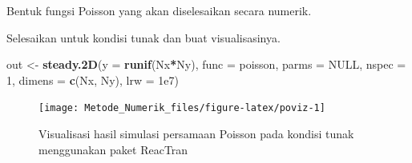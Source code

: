 \documentclass[]{book}
\newenvironment{Shaded}{\begin{snugshade}}{\end{snugshade}}
\newcommand{\ControlFlowTok}[1]{\textcolor[rgb]{0.13,0.29,0.53}{\textbf{#1}}}
\newcommand{\DataTypeTok}[1]{\textcolor[rgb]{0.13,0.29,0.53}{#1}}
\newcommand{\DecValTok}[1]{\textcolor[rgb]{0.00,0.00,0.81}{#1}}
\newcommand{\FloatTok}[1]{\textcolor[rgb]{0.00,0.00,0.81}{#1}}
\newcommand{\KeywordTok}[1]{\textcolor[rgb]{0.13,0.29,0.53}{\textbf{#1}}}
\newcommand{\NormalTok}[1]{#1}
\newcommand{\OperatorTok}[1]{\textcolor[rgb]{0.81,0.36,0.00}{\textbf{#1}}}
\newcommand{\OtherTok}[1]{\textcolor[rgb]{0.56,0.35,0.01}{#1}}
\newcommand{\StringTok}[1]{\textcolor[rgb]{0.31,0.60,0.02}{#1}}
\theoremstyle{definition}
\theoremstyle{definition}
\theoremstyle{definition}
\theoremstyle{remark}
\begin{document}
Bentuk fungsi Poisson yang akan diselesaikan secara numerik.

\begin{Shaded}
\end{Shaded}

Selesaikan untuk kondisi tunak dan buat visualisasinya.

\begin{Shaded}
\begin{Highlighting}[]
\NormalTok{out <-}\StringTok{ }\KeywordTok{steady.2D}\NormalTok{(}\DataTypeTok{y =} \KeywordTok{runif}\NormalTok{(Nx}\OperatorTok{*}\NormalTok{Ny), }
                 \DataTypeTok{func =}\NormalTok{ poisson, }
                 \DataTypeTok{parms =} \OtherTok{NULL}\NormalTok{, }
                 \DataTypeTok{nspec =} \DecValTok{1}\NormalTok{, }
                 \DataTypeTok{dimens =} \KeywordTok{c}\NormalTok{(Nx, Ny), }
                 \DataTypeTok{lrw =} \FloatTok{1e7}\NormalTok{)}
\end{Highlighting}
\end{Shaded}

\begin{figure}

{\centering \texttt{[image: Metode\_Numerik\_files/figure-latex/poviz-1]} 

}

\caption{Visualisasi hasil simulasi persamaan Poisson pada kondisi tunak menggunakan paket ReacTran}\label{fig:poviz}
\end{figure}
\end{document}
